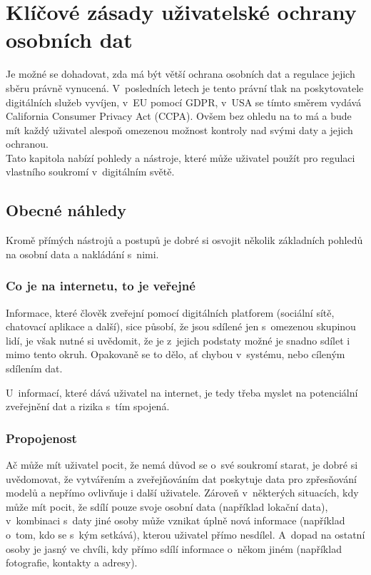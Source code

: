 \chapter{Klíčové zásady uživatelské ochrany osobních dat}

Je možné se dohadovat, zda má být větší ochrana osobních dat a regulace jejich sběru právně vynucená. V~posledních letech je tento právní tlak na poskytovatele digitálních služeb vyvíjen, v~EU pomocí GDPR, v~USA se tímto směrem vydává California Consumer Privacy Act (CCPA).
Ovšem bez ohledu na to má a bude mít každý uživatel alespoň omezenou možnost kontroly nad svými daty a jejich ochranou.\\
Tato kapitola nabízí pohledy a nástroje, které může uživatel použít pro regulaci vlastního soukromí v~digitálním světě.

\section{Obecné náhledy}
Kromě přímých nástrojů a postupů je dobré si osvojit několik základních pohledů na osobní data a nakládání s~nimi.

\subsection{Co je na internetu, to je veřejné}
Informace, které člověk zveřejní pomocí digitálních platforem (sociální sítě, chatovací aplikace a další), sice působí, že jsou sdílené jen s~omezenou skupinou lidí, je však nutné si uvědomit, že je z~jejich podstaty možné je snadno sdílet i mimo tento okruh. Opakovaně se to dělo, ať chybou v~systému, nebo cíleným sdílením dat.

U~informací, které dává uživatel na internet, je tedy třeba myslet na potenciální zveřejnění dat a rizika s~tím spojená.


\subsection{Propojenost}
Ač může mít uživatel pocit, že nemá důvod se o~své soukromí starat, je dobré si uvědomovat, že vytvářením a zveřejňováním dat poskytuje data pro zpřesňování modelů a nepřímo ovlivňuje i další uživatele. Zároveň v~některých situacích, kdy může mít pocit, že sdílí pouze svoje osobní data (například lokační data), v~kombinaci s~daty jiné osoby může vznikat úplně nová informace (například o~tom, kdo se s~kým setkává), kterou uživatel přímo nesdílel. A~dopad na ostatní osoby je jasný ve chvíli, kdy přímo sdílí informace o~někom jiném (například fotografie, kontakty a adresy).  

